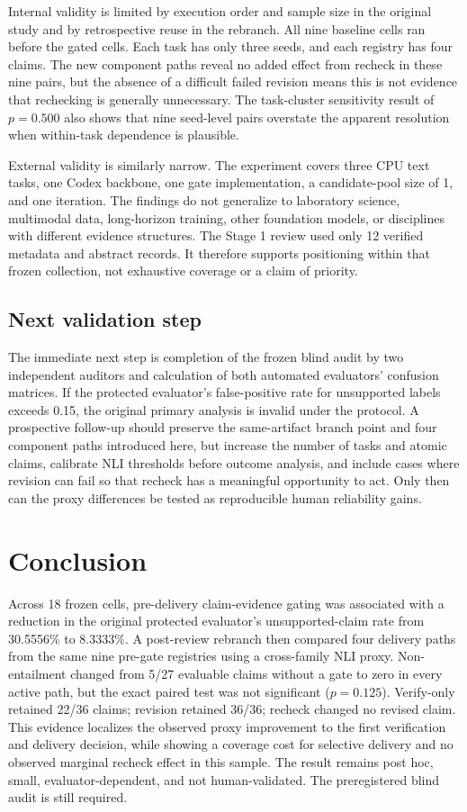 \documentclass[11pt]{article}
\begin{document}
Internal validity is limited by execution order and sample size in the original study and by retrospective reuse in the rebranch. All nine baseline cells ran before the gated cells. Each task has only three seeds, and each registry has four claims. The new component paths reveal no added effect from recheck in these nine pairs, but the absence of a difficult failed revision means this is not evidence that rechecking is generally unnecessary. The task-cluster sensitivity result of $p=0.500$ also shows that nine seed-level pairs overstate the apparent resolution when within-task dependence is plausible.

External validity is similarly narrow. The experiment covers three CPU text tasks, one Codex backbone, one gate implementation, a candidate-pool size of 1, and one iteration. The findings do not generalize to laboratory science, multimodal data, long-horizon training, other foundation models, or disciplines with different evidence structures. The Stage 1 review used only 12 verified metadata and abstract records. It therefore supports positioning within that frozen collection, not exhaustive coverage or a claim of priority.

\subsection{Next validation step}

The immediate next step is completion of the frozen blind audit by two independent auditors and calculation of both automated evaluators' confusion matrices. If the protected evaluator's false-positive rate for unsupported labels exceeds 0.15, the original primary analysis is invalid under the protocol. A prospective follow-up should preserve the same-artifact branch point and four component paths introduced here, but increase the number of tasks and atomic claims, calibrate NLI thresholds before outcome analysis, and include cases where revision can fail so that recheck has a meaningful opportunity to act. Only then can the proxy differences be tested as reproducible human reliability gains.

\section{Conclusion}

Across 18 frozen cells, pre-delivery claim-evidence gating was associated with a reduction in the original protected evaluator's unsupported-claim rate from 30.5556\% to 8.3333\%. A post-review rebranch then compared four delivery paths from the same nine pre-gate registries using a cross-family NLI proxy. Non-entailment changed from 5/27 evaluable claims without a gate to zero in every active path, but the exact paired test was not significant ($p=0.125$). Verify-only retained 22/36 claims; revision retained 36/36; recheck changed no revised claim. This evidence localizes the observed proxy improvement to the first verification and delivery decision, while showing a coverage cost for selective delivery and no observed marginal recheck effect in this sample. The result remains post hoc, small, evaluator-dependent, and not human-validated. The preregistered blind audit is still required.
\end{document}
